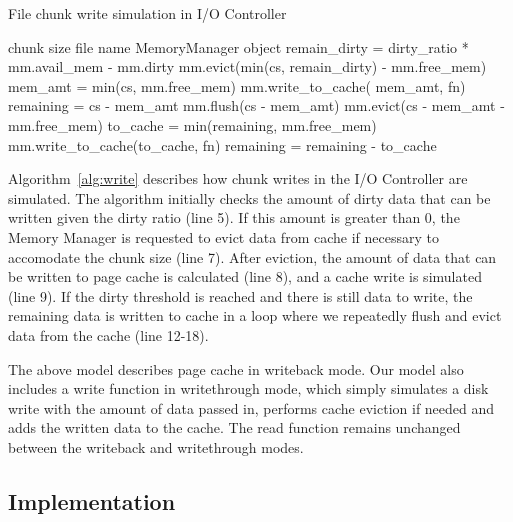 \documentclass[conference]{IEEEtran}
\newcommand{\Desc}[2]{\State \makebox[2em][l]{#1}#2}
\begin{document}
    \begin{algorithm}\caption{File chunk write simulation in I/O Controller}
    \label{alg:write}
        \small
        \begin{algorithmic}[1]
        \Input
            \Desc{cs}{chunk size}
            \Desc{fn}{file name}
            \Desc{mm}{MemoryManager object}
           \EndInput
        \State remain\_dirty = dirty\_ratio * mm.avail\_mem - mm.dirty
         
            \State mm.evict(min(cs, remain\_dirty) - mm.free\_mem)
            \State mem\_amt = min(cs, mm.free\_mem)
            \State mm.write\_to\_cache( mem\_amt, fn)
        \EndIf
        \State remaining = cs - mem\_amt
          
            \State mm.flush(cs - mem\_amt)
            \State mm.evict(cs - mem\_amt  - mm.free\_mem)
            \State to\_cache = min(remaining, mm.free\_mem)
            \State mm.write\_to\_cache(to\_cache, fn)
            \State remaining = remaining - to\_cache
        \EndWhile

        \end{algorithmic}
    \end{algorithm}
    Algorithm~\ref{alg:write} describes how chunk writes in
    the I/O Controller are simulated.
    The algorithm initially checks the  amount of dirty data that
    can be written given the dirty ratio (line 5).
    If this amount is greater than 0, the Memory Manager is requested to evict
    data from cache if necessary to accomodate the chunk size (line 7).
    After eviction, the amount of data that can be written to
    page cache is calculated (line 8), and a cache write is simulated (line 9).
    If the dirty threshold is reached and there is still data to write,
    the remaining data is written to cache in a loop
    where we repeatedly flush and evict data from the cache (line 12-18).

    The above model describes page cache in writeback
    mode. Our model also includes a write function in writethrough mode,
    which simply simulates a disk write with the amount of data passed in,
    performs cache eviction if needed and adds the written data to the
    cache. The read function remains unchanged between the writeback and
    writethrough modes.

        \subsection{Implementation}
\end{document}
